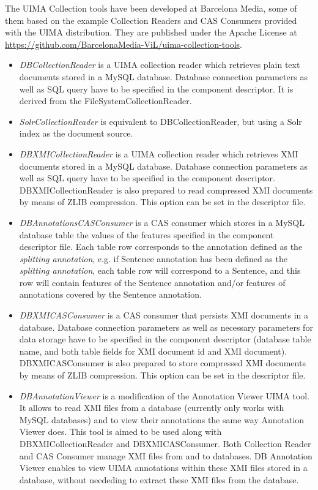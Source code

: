 \documentclass{llncs}
\begin{document}
The UIMA Collection tools have been developed at Barcelona Media, some of them based on the example Collection Readers and CAS Consumers provided with the UIMA distribution. They are published under the Apache License at \url{https://github.com/BarcelonaMedia-ViL/uima-collection-tools}.

\begin{itemize}
\item \emph{DBCollectionReader} is a UIMA collection reader which retrieves plain text documents stored in a MySQL database. Database connection parameters as well as SQL query have to be specified in the component descriptor. It is derived from the FileSystemCollectionReader.

\item \emph{SolrCollectionReader} is equivalent to DBCollectionReader, but using a Solr index as the document source.

\item \emph{DBXMICollectionReader} is a UIMA collection reader which retrieves XMI documents stored in a MySQL database. Database connection parameters as well as SQL query have to be specified in the component descriptor. DBXMICollectionReader is also prepared to read compressed XMI documents by means of ZLIB compression. This option can be set in the descriptor file.

\item \emph{DBAnnotationsCASConsumer} is a CAS consumer which stores in a  MySQL database table the values of the features specified in the component descriptor file. Each table row corresponds to the annotation defined as the \emph{splitting annotation}, e.g. if Sentence annotation has been defined as the \emph{splitting annotation}, each table row will correspond to a Sentence, and this row will contain features of the Sentence annotation and/or features of annotations covered by the Sentence annotation.

\item \emph{DBXMICASConsumer} is a CAS consumer that persists XMI documents in a database. Database connection parameters as well as necessary parameters for data storage have to be specified in the component descriptor (database table name, and both table fields for XMI document id and XMI document).
DBXMICASConsumer is also prepared to store compressed XMI documents by means of ZLIB compression. This option can be set in the descriptor file.

\item \emph{DBAnnotationViewer} is a modification of the Annotation Viewer UIMA tool. It allows to read XMI files from a database (currently only works with MySQL databases) and to view their annotations the same way Annotation Viewer does.
This tool is aimed to be used along with DBXMICollectionReader and DBXMICASConsumer. Both Collection Reader and CAS Consumer manage XMI files from and to databases. DB Annotation Viewer enables to view UIMA annotations within these XMI files stored in a database, without neededing to extract these XMI files from the database.
\end{itemize}
\end{document}
